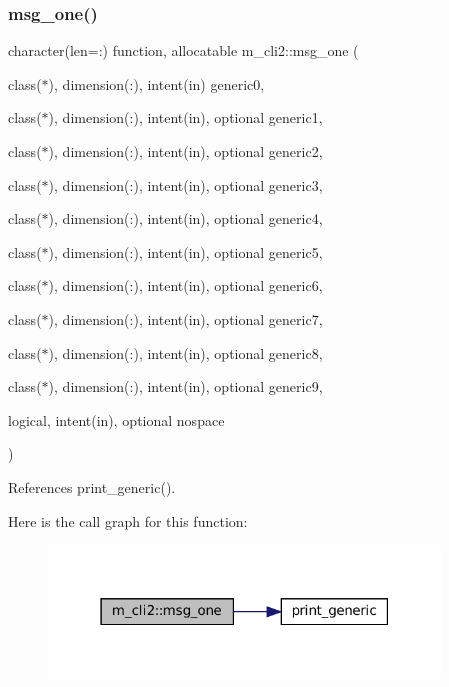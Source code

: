 \subsubsection{\texorpdfstring{msg\+\_\+one()}{msg\_one()}}
{\footnotesize\ttfamily character(len=\+:) function, allocatable m\+\_\+cli2\+::msg\+\_\+one (\begin{DoxyParamCaption}\item[{class($\ast$), dimension(\+:), intent(in)}]{generic0,  }\item[{class($\ast$), dimension(\+:), intent(in), optional}]{generic1,  }\item[{class($\ast$), dimension(\+:), intent(in), optional}]{generic2,  }\item[{class($\ast$), dimension(\+:), intent(in), optional}]{generic3,  }\item[{class($\ast$), dimension(\+:), intent(in), optional}]{generic4,  }\item[{class($\ast$), dimension(\+:), intent(in), optional}]{generic5,  }\item[{class($\ast$), dimension(\+:), intent(in), optional}]{generic6,  }\item[{class($\ast$), dimension(\+:), intent(in), optional}]{generic7,  }\item[{class($\ast$), dimension(\+:), intent(in), optional}]{generic8,  }\item[{class($\ast$), dimension(\+:), intent(in), optional}]{generic9,  }\item[{logical, intent(in), optional}]{nospace }\end{DoxyParamCaption})\hspace{0.3cm}{\ttfamily [private]}}



References print\+\_\+generic().

Here is the call graph for this function\+:
\nopagebreak
\begin{figure}[H]
\begin{center}
\leavevmode
\includegraphics[width=295pt]{namespacem__cli2_a368e9aaa556f69228e7f0837bd558b82_cgraph}
\end{center}
\end{figure}
\mbox{\label{namespacem__cli2_a737dc863a63dc101338840baad1cfd17}} 
